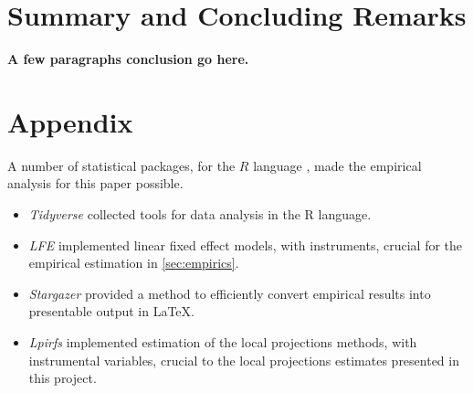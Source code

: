 \documentclass[notitlepage,12pt]{article}
\begin{document}
%


\section{Summary and Concluding Remarks}
\label{sec:conclusion}

\textbf{A few paragraphs conclusion go here.} 






\appendix
\setcounter{table}{0}
\renewcommand{\thetable}{A\arabic{table}}
\setcounter{figure}{0}
\renewcommand{\thefigure}{A\arabic{figure}}

\section{Appendix}
\label{appendix}
A number of statistical packages, for the $R$ language \citep{R2022}, made the empirical analysis for this paper possible.
\begin{itemize}
    \item \textit{Tidyverse} \citep{tidyverse} collected tools for data analysis in the R language.
    \item \textit{LFE} \citep{lfe} implemented linear fixed effect models, with instruments, crucial for the empirical estimation in \autoref{sec:empirics}.
    \item \textit{Stargazer} \citep{stargazer} provided a method to efficiently convert empirical results into presentable output in \LaTeX.
    \item \textit{Lpirfs} \citep{lpirfs2019} implemented estimation of the \cite{jorda2005} local projections methods, with instrumental variables, crucial to the local projections estimates presented in this project.
\end{itemize}
\end{document}
